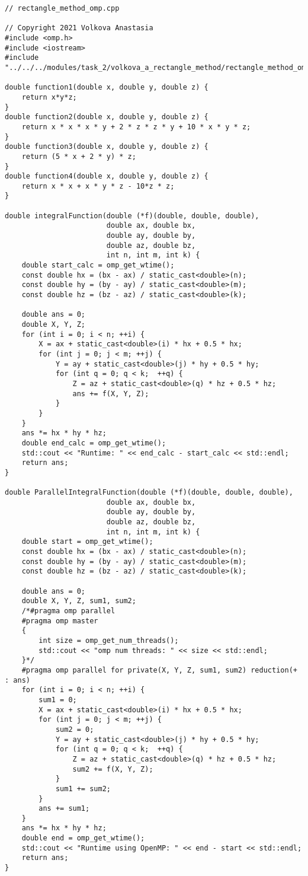 \documentclass{report}
\begin{document}
\begin{lstlisting}
// rectangle_method_omp.cpp

// Copyright 2021 Volkova Anastasia
#include <omp.h>
#include <iostream>
#include "../../../modules/task_2/volkova_a_rectangle_method/rectangle_method_omp.h"

double function1(double x, double y, double z) {
    return x*y*z;
}
double function2(double x, double y, double z) {
    return x * x * x * y + 2 * z * z * y + 10 * x * y * z;
}
double function3(double x, double y, double z) {
    return (5 * x + 2 * y) * z;
}
double function4(double x, double y, double z) {
    return x * x + x * y * z - 10*z * z;
}

double integralFunction(double (*f)(double, double, double),
                        double ax, double bx,
                        double ay, double by,
                        double az, double bz,
                        int n, int m, int k) {
    double start_calc = omp_get_wtime();
    const double hx = (bx - ax) / static_cast<double>(n);
    const double hy = (by - ay) / static_cast<double>(m);
    const double hz = (bz - az) / static_cast<double>(k);

    double ans = 0;
    double X, Y, Z;
    for (int i = 0; i < n; ++i) {
        X = ax + static_cast<double>(i) * hx + 0.5 * hx;
        for (int j = 0; j < m; ++j) {
            Y = ay + static_cast<double>(j) * hy + 0.5 * hy;
            for (int q = 0; q < k;  ++q) {
                Z = az + static_cast<double>(q) * hz + 0.5 * hz;
                ans += f(X, Y, Z);
            }
        }
    }
    ans *= hx * hy * hz;
    double end_calc = omp_get_wtime();
    std::cout << "Runtime: " << end_calc - start_calc << std::endl;
    return ans;
}

double ParallelIntegralFunction(double (*f)(double, double, double),
                        double ax, double bx,
                        double ay, double by,
                        double az, double bz,
                        int n, int m, int k) {
    double start = omp_get_wtime();
    const double hx = (bx - ax) / static_cast<double>(n);
    const double hy = (by - ay) / static_cast<double>(m);
    const double hz = (bz - az) / static_cast<double>(k);

    double ans = 0;
    double X, Y, Z, sum1, sum2;
    /*#pragma omp parallel
    #pragma omp master
    {
        int size = omp_get_num_threads();
        std::cout << "omp num threads: " << size << std::endl;
    }*/
    #pragma omp parallel for private(X, Y, Z, sum1, sum2) reduction(+ : ans)
    for (int i = 0; i < n; ++i) {
        sum1 = 0;
        X = ax + static_cast<double>(i) * hx + 0.5 * hx;
        for (int j = 0; j < m; ++j) {
            sum2 = 0;
            Y = ay + static_cast<double>(j) * hy + 0.5 * hy;
            for (int q = 0; q < k;  ++q) {
                Z = az + static_cast<double>(q) * hz + 0.5 * hz;
                sum2 += f(X, Y, Z);
            }
            sum1 += sum2;
        }
        ans += sum1;
    }
    ans *= hx * hy * hz;
    double end = omp_get_wtime();
    std::cout << "Runtime using OpenMP: " << end - start << std::endl;
    return ans;
}

\end{lstlisting}
\end{document}
